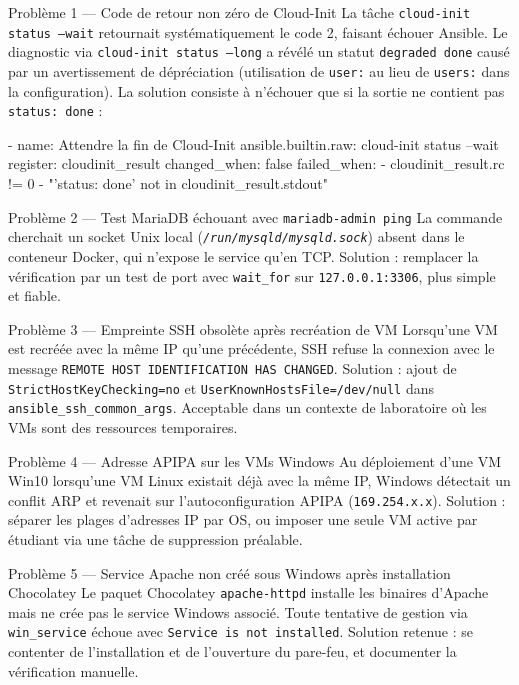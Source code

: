 \documentclass[a4paper]{article}
\newcommand{\cmd}[1]{\texttt{#1}}
\newcommand{\file}[1]{\texttt{\textit{#1}}}
\begin{document}
\begin{stepbox}{Problème 1 --- Code de retour non zéro de Cloud-Init}
  La tâche \cmd{cloud-init status --wait} retournait systématiquement le code 2, faisant échouer Ansible. Le diagnostic via \cmd{cloud-init status --long} a révélé un statut \cmd{degraded done} causé par un avertissement de dépréciation (utilisation de \cmd{user:} au lieu de \cmd{users:} dans la configuration). La solution consiste à n'échouer que si la sortie ne contient pas \cmd{status: done} :

\begin{yamlcode}
- name: Attendre la fin de Cloud-Init
  ansible.builtin.raw: cloud-init status --wait
  register: cloudinit_result
  changed_when: false
  failed_when:
    - cloudinit_result.rc != 0
    - "'status: done' not in cloudinit_result.stdout"
\end{yamlcode}
\end{stepbox}

\begin{stepbox}{Problème 2 --- Test MariaDB échouant avec \texttt{mariadb-admin ping}}
  La commande cherchait un socket Unix local (\file{/run/mysqld/mysqld.sock}) absent dans le conteneur Docker, qui n'expose le service qu'en TCP. Solution : remplacer la vérification par un test de port avec \cmd{wait\_for} sur \cmd{127.0.0.1:3306}, plus simple et fiable.
\end{stepbox}

\begin{stepbox}{Problème 3 --- Empreinte SSH obsolète après recréation de VM}
  Lorsqu'une VM est recréée avec la même IP qu'une précédente, SSH refuse la connexion avec le message \cmd{REMOTE HOST IDENTIFICATION HAS CHANGED}. Solution : ajout de \cmd{StrictHostKeyChecking=no} et \cmd{UserKnownHostsFile=/dev/null} dans \cmd{ansible\_ssh\_common\_args}. Acceptable dans un contexte de laboratoire où les VMs sont des ressources temporaires.
\end{stepbox}

\begin{stepbox}{Problème 4 --- Adresse APIPA sur les VMs Windows}
  Au déploiement d'une VM Win10 lorsqu'une VM Linux existait déjà avec la même IP, Windows détectait un conflit ARP et revenait sur l'autoconfiguration APIPA (\cmd{169.254.x.x}). Solution : séparer les plages d'adresses IP par OS, ou imposer une seule VM active par étudiant via une tâche de suppression préalable.
\end{stepbox}

\begin{stepbox}{Problème 5 --- Service Apache non créé sous Windows après installation Chocolatey}
  Le paquet Chocolatey \cmd{apache-httpd} installe les binaires d'Apache mais ne crée pas le service Windows associé. Toute tentative de gestion via \cmd{win\_service} échoue avec \cmd{Service is not installed}. Solution retenue : se contenter de l'installation et de l'ouverture du pare-feu, et documenter la vérification manuelle.
\end{stepbox}
\end{document}
